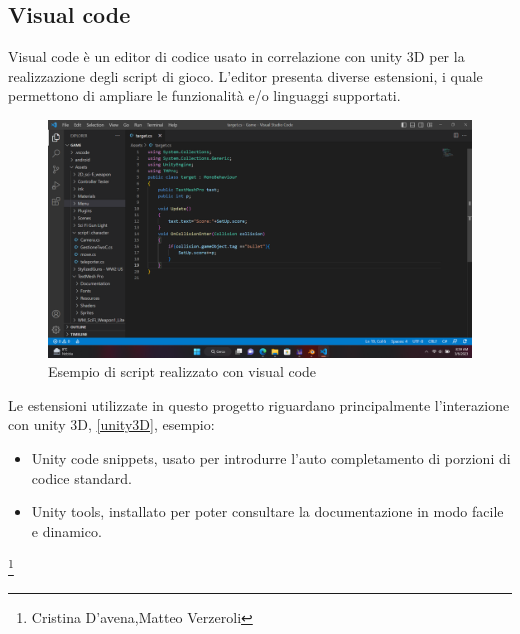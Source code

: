\documentclass[10pt,a4paper]{article}
\begin{document}
	\subsection{Visual code}
	Visual code è un editor di codice usato in correlazione con unity 3D per la realizzazione degli script di gioco.
	L'editor presenta diverse estensioni, i quale permettono di ampliare le funzionalità e/o linguaggi supportati.
	 \begin{figure}[H]
		\centering
		\includegraphics[width=0.7\linewidth]{image/visual_code}
		\caption{Esempio di script realizzato con visual code}
		\label{fig:visual_code}
	\end{figure}
    Le estensioni utilizzate in questo progetto riguardano principalmente l'interazione con unity 3D, \ref{unity3D}, esempio:
    \begin{itemize}
    	\item Unity code snippets, usato per introdurre l'auto completamento di porzioni di codice standard.
    	\item Unity tools, installato per poter consultare la documentazione in modo facile e dinamico. 
    \end{itemize}
    \newpage
    \null
    \newpage
	\thanks{Cristina D'avena,Matteo Verzeroli }
\end{document}
